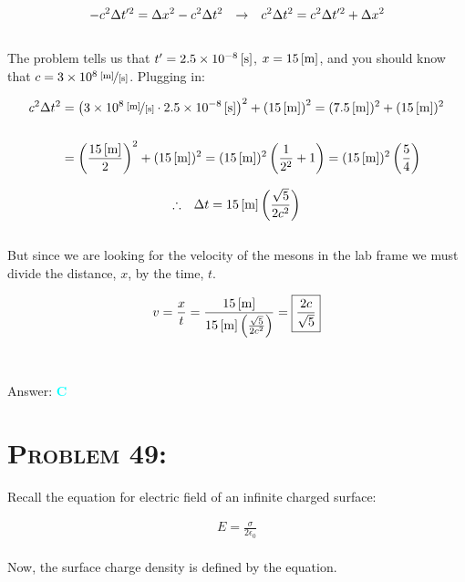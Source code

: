 \documentclass{article}
\providecommand{\e}[1]{\ensuremath{\times 10^{#1}}}
\begin{document}
\begin{gather}
- c^{2}\Delta t'^{2} = \Delta x^{2} - c^{2} \Delta t^{2} \hspace{.1in} \rightarrow \hspace{.1in} c^{2} \Delta t^{2} = c^{2}\Delta t'^{2} + \Delta x^{2}
\end{gather}
\\
The problem tells us that $t' = \unit[2.5\e{-8}]{[s]}$, $x = \unit[15]{[m]}$, and you should know that $c = \unitfrac[3\e{8}]{[m]}{[s]}$. Plugging in:

\begin{align}
c^{2} \Delta t^{2} &= \left(\unitfrac[3\e{8}]{[m]}{[s]} \cdot \unit[2.5\e{-8}]{[s]}\right)^{2} +\left( \unit[15]{[m]}\right)^{2} = (\unit[7.5]{[m]})^{2}+ (\unit[15]{[m]})^{2} \nonumber\\
 \nonumber\\
&= \left(   \frac{\unit[15]{[m]}}{2}   \right)^{2} + (\unit[15]{[m]})^{2} = (\unit[15]{[m]} )^{2} \left(   \frac{1}{2^{2}} + 1  \right) = (\unit[15]{[m]} )^{2}\left(  \frac{5}{4}  \right)\nonumber
\end{align}

\begin{gather}
\therefore \hspace{.1in} \Delta t = \unit[15]{[m]} \left(  \frac{\sqrt{5}}{2c^{2}}  \right)
\end{gather}
\\
But since we are looking for the velocity of the mesons in the lab frame we must divide the distance, $x$, by the time, $t$.

\begin{gather}
v = \frac{x}{t} = \frac{    \unit[15]{[m]}  }   {    \unit[15]{[m]}  \left(  \frac{\sqrt{5}}{2c^{2}} \right) } = \boxed{\frac{2c}{\sqrt{5}}}
\end{gather}
\\\\
Answer: \textbf{\textcolor{cyan}C}\\


\section{\textsc{Problem 49:}} Recall the equation for electric field of an infinite charged surface:

\begin{gather}
E = \frac{\sigma}{2 \epsilon_{0}}
\end{gather}
\\
Now, the surface charge density is defined by the equation. 
\end{document}
